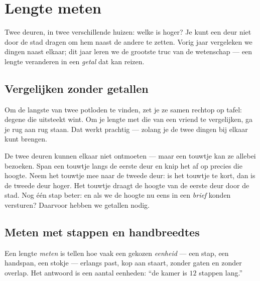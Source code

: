 \chapter{Lengte meten}\label{ch:g2:measuring-length}

Twee deuren, in twee verschillende huizen: welke is hoger? Je kunt een
deur niet door de stad dragen om hem naast de andere te zetten. Vorig
jaar vergeleken we dingen naast elkaar; dit jaar leren we de grootste
truc van de wetenschap --- een lengte veranderen in een \emph{getal}
dat kan reizen.

\section{Vergelijken zonder getallen}

\begin{example}\label{ex:g2:measuring-length:sidebyside}
Om de langste van twee potloden te vinden, zet je ze samen rechtop op
tafel: degene die uitsteekt wint. Om je lengte met die van een vriend
te vergelijken, ga je rug aan rug staan. Dat werkt prachtig --- zolang
je de twee dingen bij elkaar kunt brengen.
\end{example}

\begin{example}[De touwtruc]\label{ex:g2:measuring-length:string}
De twee deuren kunnen elkaar niet ontmoeten --- maar een touwtje kan
ze allebei bezoeken. Span een touwtje langs de eerste deur en knip het
af op precies die hoogte. Neem het touwtje mee naar de tweede deur: is
het touwtje te kort, dan is de tweede deur hoger. Het touwtje draagt de
hoogte van de eerste deur door de stad. Nog één stap beter: en als we
de hoogte nu eens in een \emph{brief} konden versturen? Daarvoor hebben
we getallen nodig.
\end{example}

\section{Meten met stappen en handbreedtes}

\begin{definition}\label{def:g2:measuring-length:measure}
Een lengte \emph{meten} is tellen hoe vaak een gekozen
\emph{eenheid} --- een stap, een handspan, een stokje
--- erlangs past, kop aan staart, zonder gaten en zonder overlap. Het
antwoord is een aantal eenheden: ``de kamer is $12$ stappen lang.''
\end{definition}

